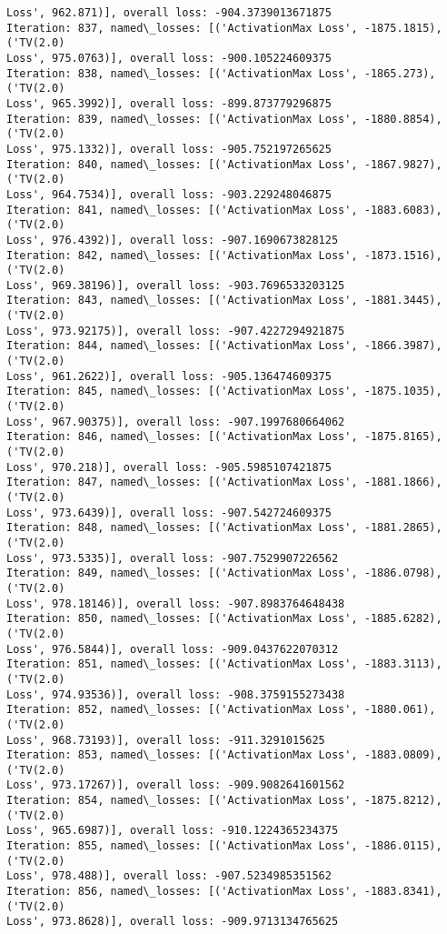\documentclass[10pt]{article}
\begin{document}
\begin{Verbatim}[commandchars=\\\{\}]
Loss', 962.871)], overall loss: -904.3739013671875
Iteration: 837, named\_losses: [('ActivationMax Loss', -1875.1815), ('TV(2.0)
Loss', 975.0763)], overall loss: -900.105224609375
Iteration: 838, named\_losses: [('ActivationMax Loss', -1865.273), ('TV(2.0)
Loss', 965.3992)], overall loss: -899.873779296875
Iteration: 839, named\_losses: [('ActivationMax Loss', -1880.8854), ('TV(2.0)
Loss', 975.1332)], overall loss: -905.752197265625
Iteration: 840, named\_losses: [('ActivationMax Loss', -1867.9827), ('TV(2.0)
Loss', 964.7534)], overall loss: -903.229248046875
Iteration: 841, named\_losses: [('ActivationMax Loss', -1883.6083), ('TV(2.0)
Loss', 976.4392)], overall loss: -907.1690673828125
Iteration: 842, named\_losses: [('ActivationMax Loss', -1873.1516), ('TV(2.0)
Loss', 969.38196)], overall loss: -903.7696533203125
Iteration: 843, named\_losses: [('ActivationMax Loss', -1881.3445), ('TV(2.0)
Loss', 973.92175)], overall loss: -907.4227294921875
Iteration: 844, named\_losses: [('ActivationMax Loss', -1866.3987), ('TV(2.0)
Loss', 961.2622)], overall loss: -905.136474609375
Iteration: 845, named\_losses: [('ActivationMax Loss', -1875.1035), ('TV(2.0)
Loss', 967.90375)], overall loss: -907.1997680664062
Iteration: 846, named\_losses: [('ActivationMax Loss', -1875.8165), ('TV(2.0)
Loss', 970.218)], overall loss: -905.5985107421875
Iteration: 847, named\_losses: [('ActivationMax Loss', -1881.1866), ('TV(2.0)
Loss', 973.6439)], overall loss: -907.542724609375
Iteration: 848, named\_losses: [('ActivationMax Loss', -1881.2865), ('TV(2.0)
Loss', 973.5335)], overall loss: -907.7529907226562
Iteration: 849, named\_losses: [('ActivationMax Loss', -1886.0798), ('TV(2.0)
Loss', 978.18146)], overall loss: -907.8983764648438
Iteration: 850, named\_losses: [('ActivationMax Loss', -1885.6282), ('TV(2.0)
Loss', 976.5844)], overall loss: -909.0437622070312
Iteration: 851, named\_losses: [('ActivationMax Loss', -1883.3113), ('TV(2.0)
Loss', 974.93536)], overall loss: -908.3759155273438
Iteration: 852, named\_losses: [('ActivationMax Loss', -1880.061), ('TV(2.0)
Loss', 968.73193)], overall loss: -911.3291015625
Iteration: 853, named\_losses: [('ActivationMax Loss', -1883.0809), ('TV(2.0)
Loss', 973.17267)], overall loss: -909.9082641601562
Iteration: 854, named\_losses: [('ActivationMax Loss', -1875.8212), ('TV(2.0)
Loss', 965.6987)], overall loss: -910.1224365234375
Iteration: 855, named\_losses: [('ActivationMax Loss', -1886.0115), ('TV(2.0)
Loss', 978.488)], overall loss: -907.5234985351562
Iteration: 856, named\_losses: [('ActivationMax Loss', -1883.8341), ('TV(2.0)
Loss', 973.8628)], overall loss: -909.9713134765625

\end{Verbatim}
\end{document}
